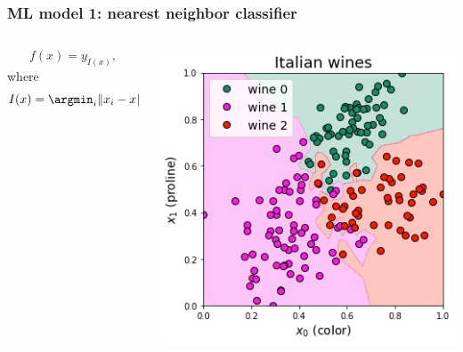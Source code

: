 \begin{frame}
    \frametitle{ML model 1: nearest neighbor classifier}
\begin{columns}
    \begin{column}{0.5\linewidth}
    \[
        f(x) = y_{I(x)},
    \]
    where
    \[
        I(x) = \argmin_i \|x_i-x\|
    \]
    \end{column}
    \begin{column}{0.5\linewidth}
        \includegraphics[scale=0.45]{wines-nn.jpg}
    \end{column}
\end{columns}
\end{frame}

